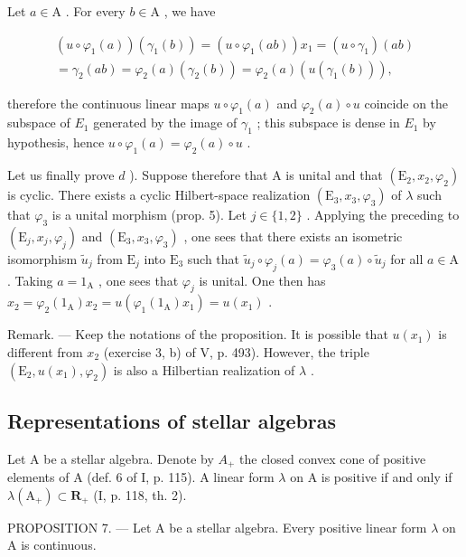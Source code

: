 Let \(a \in \mathrm{A}\) . For every \(b \in \mathrm{A}\) , we have

\[
\begin{array}{c} (u \circ \varphi_ {1} (a)) (\gamma_ {1} (b)) = (u \circ \varphi_ {1} (a b)) x _ {1} = (u \circ \gamma_ {1}) (a b) \\ = \gamma_ {2} (a b) = \varphi_ {2} (a) (\gamma_ {2} (b)) = \varphi_ {2} (a) (u (\gamma_ {1} (b))), \end{array}
\]

therefore the continuous linear maps \(u \circ \varphi_1(a)\) and \(\varphi_2(a) \circ u\) coincide on the subspace of \(E_1\) generated by the image of \(\gamma_1\) ; this subspace is dense in \(E_1\) by hypothesis, hence \(u \circ \varphi_1(a) = \varphi_2(a) \circ u\) .

Let us finally prove \(d\) ). Suppose therefore that A is unital and that \((\mathrm{E}_2, x_2, \varphi_2)\) is cyclic. There exists a cyclic Hilbert-space realization \((\mathrm{E}_3, x_3, \varphi_3)\) of \(\lambda\) such that \(\varphi_3\) is a unital morphism (prop. 5). Let \(j \in \{1, 2\}\) . Applying the preceding to \((\mathrm{E}_j, x_j, \varphi_j)\) and \((\mathrm{E}_3, x_3, \varphi_3)\) , one sees that there exists an isometric isomorphism \(\widetilde{u}_j\) from \(\mathrm{E}_j\) into \(\mathrm{E}_3\) such that \(\widetilde{u}_j \circ \varphi_j(a) = \varphi_3(a) \circ \widetilde{u}_j\) for all \(a \in \mathrm{A}\) . Taking \(a = 1_{\mathrm{A}}\) , one sees that \(\varphi_j\) is unital. One then has \(x_2 = \varphi_2(1_{\mathrm{A}})x_2 = u(\varphi_1(1_{\mathrm{A}})x_1) = u(x_1)\) .

Remark. --- Keep the notations of the proposition. It is possible that \(u(x_{1})\) is different from \(x_{2}\) (exercise 3, b) of V, p. 493). However, the triple \((\mathrm{E}_{2}, u(x_{1}), \varphi_{2})\) is also a Hilbertian realization of \(\lambda\) .

\subsection{Representations of stellar algebras}

Let A be a stellar algebra. Denote by \(A_{+}\) the closed convex cone of positive elements of A (def. 6 of I, p. 115). A linear form \(\lambda\) on A is positive if and only if \(\lambda(\mathrm{A}_{+}) \subset \mathbf{R}_{+}\) (I, p. 118, th. 2).

PROPOSITION 7. --- Let A be a stellar algebra. Every positive linear form \(\lambda\) on A is continuous.

